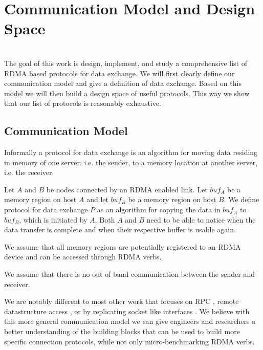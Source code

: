 \section{Communication Model and Design Space}\label{sec:model}
\\

The goal of this work is design, implement, and study a comprehensive list of RDMA based protocols for data exchange. We will 
first clearly define our communication model and give a definition of data exchange. Based on this model we will then build 
a design space of useful protocols. This way we show that our list of protocols is reasonably exhaustive.

\subsection{Communication Model}

Informally a protocol for data exchange is an algorithm for moving data residing in memory of one server, i.e. the sender, to 
a memory location at another server, i.e. the receiver.

\begin{defn}
Let $A$ and $B$ be nodes connected by an RDMA enabled link. Let $buf_A$ be a memory region on host $A$ and let $buf_B$ 
be a memory region on host $B$. We define protocol for data exchange $P$ as an algorithm for copying the
data in $buf_A$ to $buf_B$, which is initiated by $A$. Both $A$ and $B$ need to be able to notice when the data transfer
is complete and when their respective buffer is usable again.
\end{defn}

\begin{rem}
  We assume that all memory regions are potentially registered to an RDMA device and can be accessed through RDMA verbs.
\end{rem}

\begin{rem}
  We assume that there is no out of band communication between the sender and receiver.
\end{rem}



We are notably different to most other work that focuses on RPC \cite{herd, guidlines}, remote datastructure access 
\cite{pilaf, others}, or by replicating socket like interfaces \cite{SocksDirect}. We believe with this more general
communication model we can give engineers and researchers a better understanding of the building blocks that can be 
used to build more specific connection protocols, while not only micro-benchmarking RDMA verbs.


